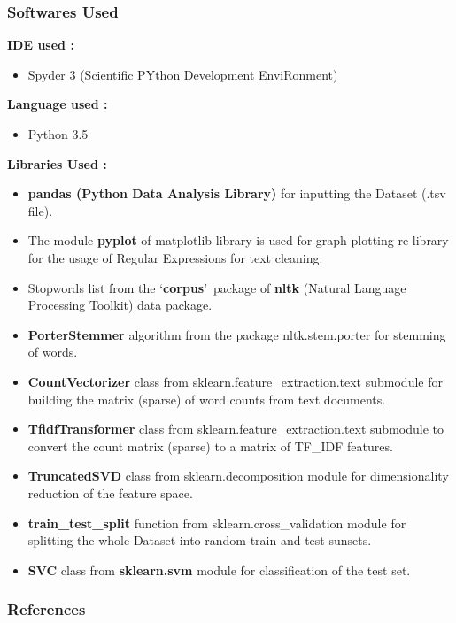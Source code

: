 \documentclass{beamer}
\newcommand\tab[1][1cm]{\hspace*{#1}}
\begin{document}
\begin{frame}[t, allowframebreaks]
\frametitle{\tab \tab \tab \tab \huge Softwares Used}
\textbf{IDE used :}
\begin{itemize}
\item Spyder 3 (Scientific PYthon Development EnviRonment)
\end{itemize}
\textbf{Language used :}
\begin{itemize}
\item Python 3.5
\end{itemize}
\textbf{Libraries Used :}
\begin{itemize}
\item \textbf{pandas (Python Data Analysis Library)} for inputting the Dataset (.tsv file).

\item The module \textbf{pyplot} of matplotlib library is used for graph plotting
re library for the usage of Regular Expressions for text cleaning.

\item Stopwords list from the \lq \textbf{corpus}\rq \ package of \textbf{nltk} (Natural Language Processing Toolkit) data package.

\item \textbf{PorterStemmer} algorithm from the package nltk.stem.porter for stemming of words.

\item \textbf{CountVectorizer} class from sklearn.feature\_extraction.text submodule for building the matrix (sparse) of word counts from text documents.

\item \textbf{TfidfTransformer} class from sklearn.feature\_extraction.text submodule to convert the count matrix (sparse) to a matrix of TF\_IDF features.

\item \textbf{TruncatedSVD} class from sklearn.decomposition module for dimensionality reduction of the feature space.

\item \textbf{train\_test\_split} function from sklearn.cross\_validation module for splitting the whole Dataset into random train and test sunsets.

\item \textbf{SVC} class from \textbf{sklearn.svm} module for classification of the test set.
\end{itemize}
\end{frame}

\tiny
\begin{frame}[t,allowframebreaks]
\frametitle {\tab \tab \tab \tab \huge References}


\end{frame}

\end{document}
